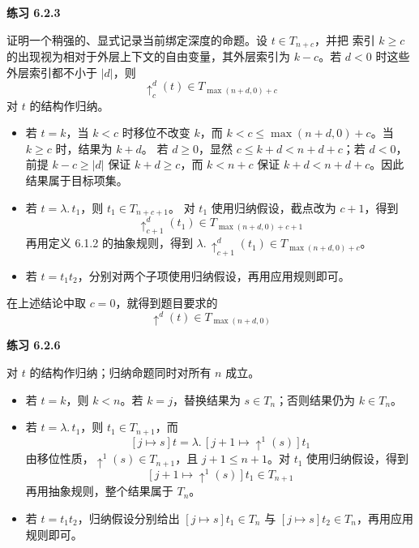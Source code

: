 \begin{taplsolutionentrybox}
\label{sol:translator:6.2.3}
\textbf{练习 6.2.3}

证明一个稍强的、显式记录当前绑定深度的命题。设 \(t\in T_{n+c}\)，并把
索引 \(k\geq c\) 的出现视为相对于外层上下文的自由变量，其外层索引为
\(k-c\)。若 \(d<0\) 时这些外层索引都不小于 \(|d|\)，则
\[
  \uparrow^d_c(t)\in T_{\max(n+d,0)+c}
\]
对 \(t\) 的结构作归纳。

\begin{itemize}
  \item 若 \(t=k\)，当 \(k<c\) 时移位不改变 \(k\)，而
    \(k<c\leq\max(n+d,0)+c\)。当 \(k\geq c\) 时，结果为 \(k+d\)。
    若 \(d\geq0\)，显然
    \(c\leq k+d<n+d+c\)；若 \(d<0\)，前提
    \(k-c\geq|d|\) 保证 \(k+d\geq c\)，而 \(k<n+c\) 保证
    \(k+d<n+d+c\)。因此结果属于目标项集。
  \item 若 \(t=\lambda.\,t_1\)，则 \(t_1\in T_{n+c+1}\)。
    对 \(t_1\) 使用归纳假设，截点改为 \(c+1\)，得到
    \[
      \uparrow^d_{c+1}(t_1)
      \in T_{\max(n+d,0)+c+1}
    \]
    再用定义 6.1.2 的抽象规则，得到
    \(\lambda.\,\uparrow^d_{c+1}(t_1)
      \in T_{\max(n+d,0)+c}\)。
  \item 若 \(t=t_1t_2\)，分别对两个子项使用归纳假设，再用应用规则即可。
\end{itemize}

在上述结论中取 \(c=0\)，就得到题目要求的
\[
  \uparrow^d(t)\in T_{\max(n+d,0)}
\]

\end{taplsolutionentrybox}

\begin{taplsolutionentrybox}
\label{sol:translator:6.2.6}
\textbf{练习 6.2.6}

对 \(t\) 的结构作归纳；归纳命题同时对所有 \(n\) 成立。

\begin{itemize}
  \item 若 \(t=k\)，则 \(k<n\)。若 \(k=j\)，替换结果为
    \(s\in T_n\)；否则结果仍为 \(k\in T_n\)。
  \item 若 \(t=\lambda.\,t_1\)，则 \(t_1\in T_{n+1}\)，而
    \[
      [j\mapsto s]t
      =\lambda.\,[j+1\mapsto\uparrow^1(s)]t_1
    \]
    由移位性质，\(\uparrow^1(s)\in T_{n+1}\)，且
    \(j+1\leq n+1\)。对 \(t_1\) 使用归纳假设，得到
    \[
      [j+1\mapsto\uparrow^1(s)]t_1\in T_{n+1}
    \]
    再用抽象规则，整个结果属于 \(T_n\)。
  \item 若 \(t=t_1t_2\)，归纳假设分别给出
    \([j\mapsto s]t_1\in T_n\) 与
    \([j\mapsto s]t_2\in T_n\)，再用应用规则即可。
\end{itemize}

\end{taplsolutionentrybox}

